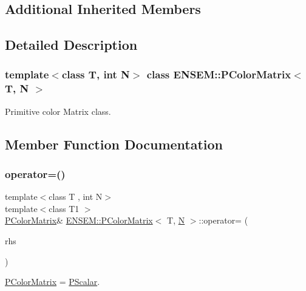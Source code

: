 \subsection*{Additional Inherited Members}


\subsection{Detailed Description}
\subsubsection*{template$<$class T, int N$>$\newline
class E\+N\+S\+E\+M\+::\+P\+Color\+Matrix$<$ T, N $>$}

Primitive color Matrix class. 

\subsection{Member Function Documentation}
\mbox{\label{classENSEM_1_1PColorMatrix_a7750e72b224e47b6a559f3dc112b72d3}} 
\subsubsection{\texorpdfstring{operator=()}{operator=()}\hspace{0.1cm}{\footnotesize\ttfamily [1/4]}}
{\footnotesize\ttfamily template$<$class T , int N$>$ \\
template$<$class T1 $>$ \\
\mbox{\hyperlink{classENSEM_1_1PColorMatrix}{P\+Color\+Matrix}}\& \mbox{\hyperlink{classENSEM_1_1PColorMatrix}{E\+N\+S\+E\+M\+::\+P\+Color\+Matrix}}$<$ T, \mbox{\hyperlink{operator__name__util_8cc_a7722c8ecbb62d99aee7ce68b1752f337}{N}} $>$\+::operator= (\begin{DoxyParamCaption}\item[{const \mbox{\hyperlink{classENSEM_1_1PScalar}{P\+Scalar}}$<$ T1 $>$ \&}]{rhs }\end{DoxyParamCaption})\hspace{0.3cm}{\ttfamily [inline]}}



\mbox{\hyperlink{classENSEM_1_1PColorMatrix}{P\+Color\+Matrix}} = \mbox{\hyperlink{classENSEM_1_1PScalar}{P\+Scalar}}. 

